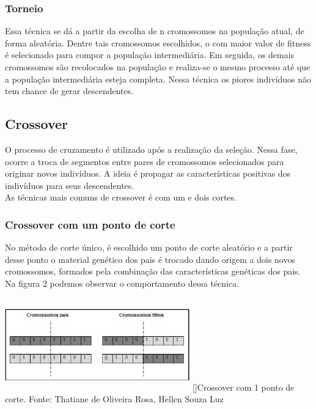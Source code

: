 \documentclass[a4paper,11pt]{article}
\newenvironment{Figure}
  {\par\medskip\noindent\minipage{\linewidth}}
    {\endminipage\par\medskip}
\begin{document}
\begin{multicols}{2}
\subsubsection{Torneio}
Essa técnica se dá a partir da escolha de n cromossomos na população atual, de forma aleatória. Dentre tais cromossomos escolhidos, o com maior valor de fitness é selecionado para compor a população intermediária. Em seguida, os demais cromossomos são recolocados na população e realiza-se o mesmo processo até que a população intermediária esteja completa. Nessa técnica os piores indivíduos não tem chance de gerar descendentes.

\subsection{Crossover}
O processo de cruzamento é utilizado após a realização da seleção. Nessa fase, ocorre a troca de segmentos entre pares de cromossomos selecionados para originar novos indivíduos. A ideia é propagar as características positivas dos indivíduos para seus descendentes.\\
As técnicas mais comuns de crossover é com um e dois cortes.\\

\subsubsection{Crossover com um ponto de corte}
No método de corte único, é escolhido um ponto de corte aleatório e a partir desse ponto o material genético dos pais é trocado dando origem a dois novos cromossomos, formados pela combinação das características genéticas dos pais. Na figura 2 podemos observar o comportamento dessa técnica.
\begin{Figure}
	\centering 
	\includegraphics[width=8cm, height=4cm]{figura2}
	[]{Crossover com 1 ponto de corte. Fonte: Thatiane de Oliveira Rosa, Hellen Souza Luz}
	\label{medium}
\end{Figure}


\end{multicols}
\end{document}
